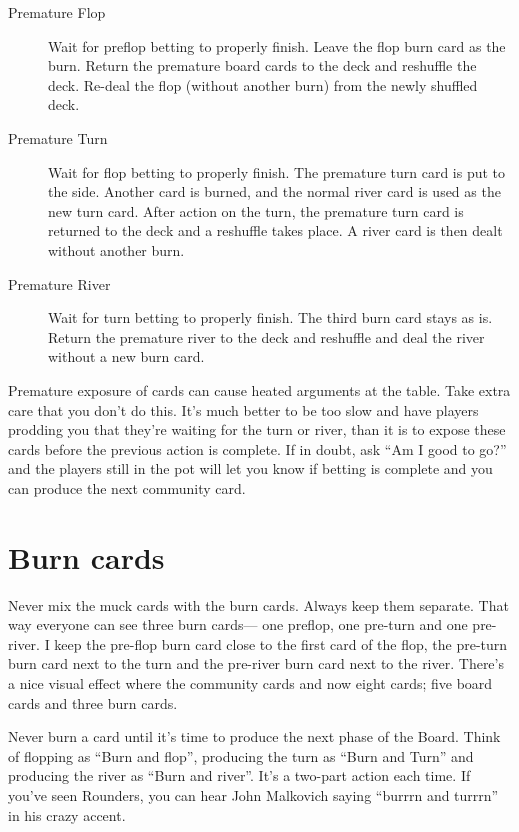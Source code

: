 \begin{description}

\item[Premature Flop] Wait for preflop betting to properly finish.
Leave the flop burn card as the burn. Return the premature board
cards to the deck and reshuffle the deck. Re-deal the flop
(without another burn) from the newly shuffled deck.

\item[Premature Turn]  Wait for flop betting to properly finish.
The premature turn card is put to the side.
Another card is burned, and the normal river card is used as the new turn card.
After action on the turn, the premature turn card is returned to the deck
and a reshuffle takes place. A river card is then dealt without another
burn.

\item[Premature River] Wait for turn betting to properly finish.
The third burn card stays as is. Return the premature river to the
deck and reshuffle and deal the river without a new burn card.

\end{description}

Premature exposure of cards can cause heated arguments at the table.
Take extra care that you don't do this. It's much better to be too slow
and have players prodding you that they're waiting for the turn or
river, than it is to expose these cards before the previous action
is complete. If in doubt, ask ``Am I good to go?'' and the players still
in the pot will let you know if betting is complete and you can
produce the next community card.

\section{Burn cards}

Never mix the muck cards with the burn cards. Always keep them
separate. That way everyone can see three burn cards--- one preflop,
one pre-turn and one pre-river. I keep the pre-flop burn card close to
the first card of the flop, the pre-turn burn card next to the turn and
the pre-river burn card next to the river. There's a nice visual effect
where the community cards and now eight cards; five board cards and three
burn cards.


Never burn a card until it's time to produce the next phase
of the Board. Think of flopping as ``Burn and flop'', producing the
turn as ``Burn and Turn'' and producing the river as ``Burn and river''.
It's a two-part action each time. If you've seen Rounders, you can
hear John Malkovich saying ``burrrn and turrrn'' in his crazy accent.

